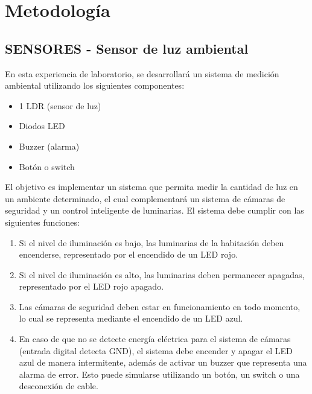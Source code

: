 \documentclass{article}
\begin{document}




\section{Metodología}

\subsection{SENSORES - Sensor de luz ambiental}


En esta experiencia de laboratorio, se desarrollará un sistema de medición ambiental utilizando los siguientes componentes: 
\begin{itemize}
    \item 1 LDR (sensor de luz)
    \item Diodos LED
    \item Buzzer (alarma)
    \item Botón o switch
\end{itemize}

El objetivo es implementar un sistema que permita medir la cantidad de luz en un ambiente determinado, el cual complementará un sistema de cámaras de seguridad y un control inteligente de luminarias. El sistema debe cumplir con las siguientes funciones:
\begin{enumerate}
    \item Si el nivel de iluminación es bajo, las luminarias de la habitación deben encenderse, representado por el encendido de un LED rojo.
    \item Si el nivel de iluminación es alto, las luminarias deben permanecer apagadas, representado por el LED rojo apagado.
    \item Las cámaras de seguridad deben estar en funcionamiento en todo momento, lo cual se representa mediante el encendido de un LED azul.
    \item En caso de que no se detecte energía eléctrica para el sistema de cámaras (entrada digital detecta GND), el sistema debe encender y apagar el LED azul de manera intermitente, además de activar un buzzer que representa una alarma de error. Esto puede simularse utilizando un botón, un switch o una desconexión de cable.
\end{enumerate}
\end{document}
